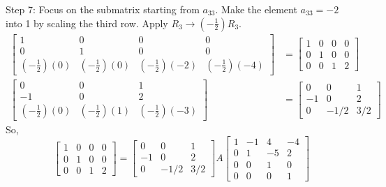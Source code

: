 \documentclass{article}
\begin{document}
Step 7: Focus on the submatrix starting from $a_{33}$. Make the element $a_{33}=-2$ into 1 by scaling the third row.
Apply $R_3 \to (-\frac{1}{2})R_3$.
\begin{align*} \begin{bmatrix} 1 & 0 & 0 & 0 \\ 0 & 1 & 0 & 0 \\ (-\frac{1}{2})(0) & (-\frac{1}{2})(0) & (-\frac{1}{2})(-2) & (-\frac{1}{2})(-4) \end{bmatrix} &= \begin{bmatrix} 1 & 0 & 0 & 0 \\ 0 & 1 & 0 & 0 \\ 0 & 0 & 1 & 2 \end{bmatrix} \\ \begin{bmatrix} 0 & 0 & 1 \\ -1 & 0 & 2 \\ (-\frac{1}{2})(0) & (-\frac{1}{2})(1) & (-\frac{1}{2})(-3) \end{bmatrix} &= \begin{bmatrix} 0 & 0 & 1 \\ -1 & 0 & 2 \\ 0 & -1/2 & 3/2 \end{bmatrix}\end{align*}
So,
\[ \begin{bmatrix} 1 & 0 & 0 & 0 \\ 0 & 1 & 0 & 0 \\ 0 & 0 & 1 & 2 \end{bmatrix} = \begin{bmatrix} 0 & 0 & 1 \\ -1 & 0 & 2 \\ 0 & -1/2 & 3/2 \end{bmatrix} A \begin{bmatrix} 1 & -1 & 4 & -4 \\ 0 & 1 & -5 & 2 \\ 0 & 0 & 1 & 0 \\ 0 & 0 & 0 & 1 \end{bmatrix} \]
\end{document}
